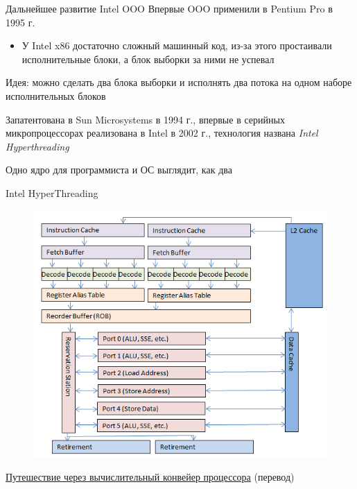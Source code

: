 \documentclass[xetex,aspectratio=43]{beamer}
\begin{document}
\begin{frame}{Дальнейшее развитие Intel OOO}
        Впервые OOO применили в Pentium Pro в 1995 г.

        \begin{itemize}
            \tightlist
            \item
            У Intel x86 достаточно сложный машинный код, из-за этого простаивали
            исполнительные блоки, а блок выборки за ними не успевал
        \end{itemize}

        \pause

        Идея: можно сделать два блока выборки и исполнять два потока на одном
        наборе исполнительных блоков

        Запатентована в Sun Microsystems в 1994 г., впервые в серийных
        микропроцессорах реализована в Intel в 2002 г., технология названа \emph{Intel
        Hyperthreading}

        Одно ядро для программиста и ОС выглядит, как два
\end{frame}

\begin{frame}{Intel HyperThreading}
    \begin{figure}
        \includegraphics[height=0.8\textheight]{img/11.Intel_HT.png}
    \end{figure}

    \href{https://habr.com/ru/post/182002/}{Путешествие через вычислительный конвейер процессора} (перевод)
\end{frame}
\end{document}
